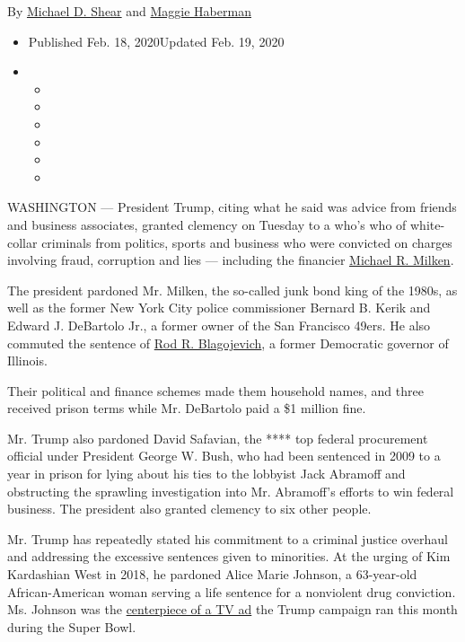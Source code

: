 By \href{https://www.nytimes.com/by/michael-d-shear}{Michael D. Shear}
and \href{https://www.nytimes.com/by/maggie-haberman}{Maggie Haberman}

\begin{itemize}
\item
  Published Feb. 18, 2020Updated Feb. 19, 2020
\item
  \begin{itemize}
  \item
  \item
  \item
  \item
  \item
  \item
  \end{itemize}
\end{itemize}

WASHINGTON --- President Trump, citing what he said was advice from
friends and business associates, granted clemency on Tuesday to a who's
who of white-collar criminals from politics, sports and business who
were convicted on charges involving fraud, corruption and lies ---
including the financier
\href{https://www.nytimes.com/2020/02/18/business/michael-milken-case-lessons.html}{Michael
R. Milken}.

The president pardoned Mr. Milken, the so-called junk bond king of the
1980s, as well as the former New York City police commissioner Bernard
B. Kerik and Edward J. DeBartolo Jr., a former owner of the San
Francisco 49ers. He also commuted the sentence of
\href{https://www.nytimes.com/2020/02/19/us/rod-blagojevich-chicago.html}{Rod
R. Blagojevich}, a former Democratic governor of Illinois.

Their political and finance schemes made them household names, and three
received prison terms while Mr. DeBartolo paid a \$1 million fine.

Mr. Trump also pardoned David Safavian, the **** top federal procurement
official under President George W. Bush, who had been sentenced in 2009
to a year in prison for lying about his ties to the lobbyist Jack
Abramoff and obstructing the sprawling investigation into Mr. Abramoff's
efforts to win federal business. The president also granted clemency to
six other people.

Mr. Trump has repeatedly stated his commitment to a criminal justice
overhaul and addressing the excessive sentences given to minorities. At
the urging of Kim Kardashian West in 2018, he pardoned Alice Marie
Johnson, a 63-year-old African-American woman serving a life sentence
for a nonviolent drug conviction. Ms. Johnson was the
\href{https://www.nytimes.com/2020/02/06/us/politics/alice-johnson-trump-super-bowl-ad.html}{centerpiece
of a TV ad} the Trump campaign ran this month during the Super Bowl.


